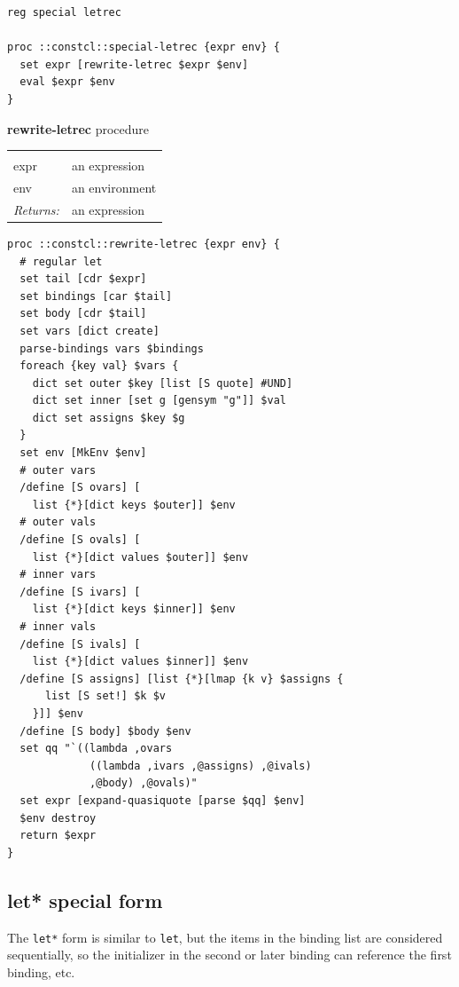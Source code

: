 \documentclass[twoside]{report}
\begin{document}
\begin{lstlisting}
reg special letrec

proc ::constcl::special-letrec {expr env} {
  set expr [rewrite-letrec $expr $env]
  eval $expr $env
}
\end{lstlisting}

\textbf{rewrite-letrec} procedure

\noindent\begin{tabular}{ |p{1.9cm} p{8cm}| }
\hline
\rowcolor[HTML]{CCCCCC} \multicolumn{2}{|l|}{\bf rewrite-letrec (internal)} \\
expr & an expression \\
env & an environment \\
\textit{Returns:} & an expression \\
\hline
\end{tabular}

\begin{lstlisting}
proc ::constcl::rewrite-letrec {expr env} {
  # regular let
  set tail [cdr $expr]
  set bindings [car $tail]
  set body [cdr $tail]
  set vars [dict create]
  parse-bindings vars $bindings
  foreach {key val} $vars {
    dict set outer $key [list [S quote] #UND]
    dict set inner [set g [gensym "g"]] $val
    dict set assigns $key $g
  }
  set env [MkEnv $env]
  # outer vars
  /define [S ovars] [
    list {*}[dict keys $outer]] $env
  # outer vals
  /define [S ovals] [
    list {*}[dict values $outer]] $env
  # inner vars
  /define [S ivars] [
    list {*}[dict keys $inner]] $env
  # inner vals
  /define [S ivals] [
    list {*}[dict values $inner]] $env
  /define [S assigns] [list {*}[lmap {k v} $assigns {
      list [S set!] $k $v
    }]] $env
  /define [S body] $body $env
  set qq "`((lambda ,ovars
             ((lambda ,ivars ,@assigns) ,@ivals)
             ,@body) ,@ovals)"
  set expr [expand-quasiquote [parse $qq] $env]
  $env destroy
  return $expr
}
\end{lstlisting}

\subsection{let* special form}
\label{let-special-form1}

The \texttt{let*} form is similar to \texttt{let}, but the items in the binding list are considered sequentially, so the initializer in the second or later binding can reference the first binding, etc.
\end{document}
